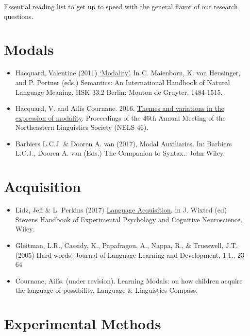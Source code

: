 \documentclass[
]{book}
\begin{document}
Essential reading list to get up to speed with the general flavor of our research questions.

\hypertarget{modals}{%
\section{Modals}\label{modals}}

\begin{itemize}
\item
  Hacquard, Valentine (2011)
  \href{http://ling.umd.edu//~hacquard/papers/HoS_Modality_Hacquard.pdf}{`Modality'}. In C. Maienborn, K. von Heusinger, and P. Portner (eds.) Semantics: An International Handbook of Natural Language Meaning. HSK 33.2 Berlin: Mouton de Gruyter. 1484-1515.
\item
  Hacquard, V. and Ailís Cournane. 2016. \href{https://s18798.pcdn.co/cournane/wp-content/uploads/sites/5271/2016/09/Hacquard_Cournane_NELS.pdf}{Themes and variations in the expression of modality}. Proceedings of the 46th Annual Meeting of the Northeastern Linguistics Society (NELS 46).
\item
  Barbiers L.C.J. \& Dooren A. van (2017), Modal Auxiliaries. In: Barbiers L.C.J., Dooren A. van (Eds.) The Companion to Syntax.: John Wiley.
\end{itemize}

\hypertarget{acquisition}{%
\section{Acquisition}\label{acquisition}}

\begin{itemize}
\item
  Lidz, Jeff \& L. Perkins (2017) \href{http://ling.umd.edu/assets/publications/Lidz-Perkins-17-LanguageAcquisition.pdf}{Language Acquisition}. in J. Wixted (ed) Stevens Handbook of Experimental Psychology and Cognitive Neuroscience. Wiley.
\item
  Gleitman, L.R., Cassidy, K., Papafragou, A., Nappa, R., \& Trueswell, J.T. (2005) Hard words. Journal of Language Learning and Development, 1:1., 23-64
\item
  Cournane, Ailís. (under revision). Learning Modals: on how children acquire the language of possibility. Language \& Linguistics Compass.
\end{itemize}

\hypertarget{experimental-methods}{%
\section{Experimental Methods}\label{experimental-methods}}
\end{document}

